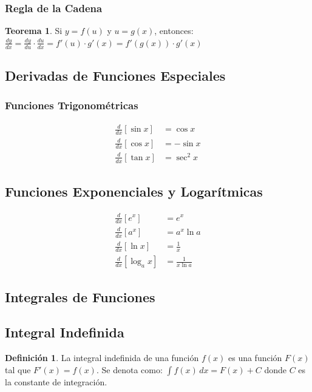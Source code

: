 \documentclass[12pt, a4paper, oneside]{book}
\theoremstyle{definition}
\newtheorem{definicion}{Definición}[chapter]
\newtheorem{teorema}{Teorema}[chapter]
\begin{document}
\subsubsection{Regla de la Cadena}

\begin{teorema}
Si $y = f(u)$ y $u = g(x)$, entonces:
$\frac{dy}{dx} = \frac{dy}{du} \cdot \frac{du}{dx} = f'(u) \cdot g'(x) = f'(g(x)) \cdot g'(x)$
\end{teorema}

\subsection{Derivadas de Funciones Especiales}

\subsubsection{Funciones Trigonométricas}
\begin{align}
\frac{d}{dx}[\sin x] &= \cos x \\
\frac{d}{dx}[\cos x] &= -\sin x \\
\frac{d}{dx}[\tan x] &= \sec^2 x
\end{align}

\subsection{Funciones Exponenciales y Logarítmicas}
\begin{align}
\frac{d}{dx}[e^x] &= e^x \\
\frac{d}{dx}[a^x] &= a^x \ln a \\
\frac{d}{dx}[\ln x] &= \frac{1}{x} \\
\frac{d}{dx}[\log_a x] &= \frac{1}{x \ln a}
\end{align}

\subsection{Integrales de Funciones}

\subsection{Integral Indefinida}

\begin{definicion}
La integral indefinida de una función $f(x)$ es una función $F(x)$ tal que $F'(x) = f(x)$. Se denota como:
$\int f(x) \, dx = F(x) + C$
donde $C$ es la constante de integración.
\end{definicion}
\end{document}
